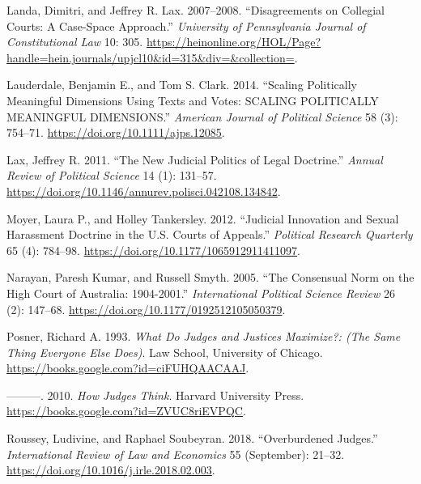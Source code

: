\documentclass[
  11pt,
]{article}
\newlength{\cslhangindent}
\newenvironment{CSLReferences}[2] %
 {%
  \setlength{\parindent}{0pt}
  \ifodd #1 \everypar{\setlength{\hangindent}{\cslhangindent}}\ignorespaces\fi
  \ifnum #2 > 0
  \setlength{\parskip}{#2\baselineskip}
  \fi
 }%
 {}
\begin{document}
\begin{CSLReferences}{1}{0}
\leavevmode{}%
Landa, Dimitri, and Jeffrey R. Lax. 2007--2008. {``Disagreements on
{Collegial Courts}: {A Case-Space Approach}.''} \emph{University of
Pennsylvania Journal of Constitutional Law} 10: 305.
\url{https://heinonline.org/HOL/Page?handle=hein.journals/upjcl10&id=315&div=&collection=}.

\leavevmode{}%
Lauderdale, Benjamin E., and Tom S. Clark. 2014. {``Scaling {Politically
Meaningful Dimensions Using Texts} and {Votes}: {SCALING POLITICALLY
MEANINGFUL DIMENSIONS}.''} \emph{American Journal of Political Science}
58 (3): 754--71. \url{https://doi.org/10.1111/ajps.12085}.

\leavevmode{}%
Lax, Jeffrey R. 2011. {``The {New Judicial Politics} of {Legal
Doctrine}.''} \emph{Annual Review of Political Science} 14 (1): 131--57.
\url{https://doi.org/10.1146/annurev.polisci.042108.134842}.

\leavevmode{}%
Moyer, Laura P., and Holley Tankersley. 2012. {``Judicial {Innovation}
and {Sexual Harassment Doctrine} in the {U}.{S}. {Courts} of
{Appeals}.''} \emph{Political Research Quarterly} 65 (4): 784--98.
\url{https://doi.org/10.1177/1065912911411097}.

\leavevmode{}%
Narayan, Paresh Kumar, and Russell Smyth. 2005. {``The {Consensual Norm}
on the {High Court} of {Australia}: 1904-2001.''} \emph{International
Political Science Review} 26 (2): 147--68.
\url{https://doi.org/10.1177/0192512105050379}.

\leavevmode{}%
Posner, Richard A. 1993. \emph{What {Do Judges} and {Justices
Maximize}?: (The {Same Thing Everyone Else Does})}. {Law School,
University of Chicago}. \url{https://books.google.com?id=ciFUHQAACAAJ}.

\leavevmode{}%
---------. 2010. \emph{How {Judges Think}}. {Harvard University Press}.
\url{https://books.google.com?id=ZVUC8riEVPQC}.

\leavevmode{}%
Roussey, Ludivine, and Raphael Soubeyran. 2018. {``Overburdened
Judges.''} \emph{International Review of Law and Economics} 55
(September): 21--32. \url{https://doi.org/10.1016/j.irle.2018.02.003}.


\end{CSLReferences}
\end{document}

